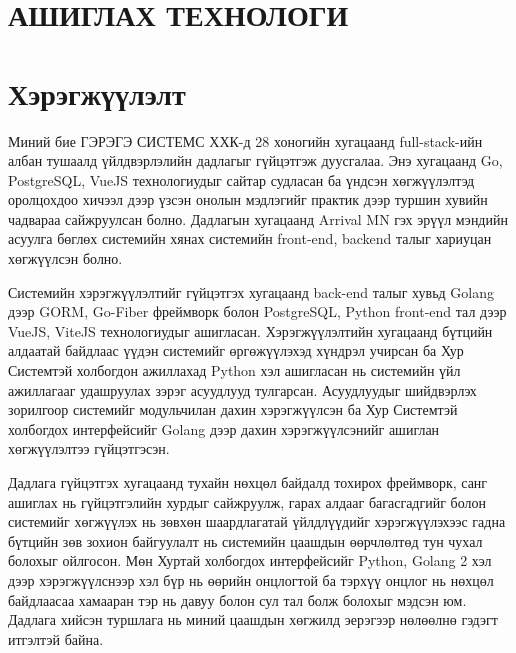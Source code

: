 \documentclass[12pt,A4]{report}
\begin{document}
\chapter{АШИГЛАХ ТЕХНОЛОГИ}


\chapter{Хэрэгжүүлэлт} 



Миний бие ГЭРЭГЭ СИСТЕМС ХХК-д 28 хоногийн хугацаанд full-stack-ийн албан тушаалд үйлдвэрлэлийн дадлагыг гүйцэтгэж дуусгалаа. Энэ хугацаанд Go, PostgreSQL, VueJS технологиудыг сайтар судласан ба үндсэн хөгжүүлэлтэд оролцохдоо хичээл дээр үзсэн онолын мэдлэгийг практик дээр туршин хувийн чадвараа сайжруулсан болно. Дадлагын хугацаанд Arrival MN гэх эрүүл мэндийн асуулга бөглөх системийн хянах системийн front-end, backend талыг хариуцан хөгжүүлсэн болно. 

\setlength\parindent{24pt} Системийн хэрэгжүүлэлтийг гүйцэтгэх хугацаанд back-end талыг хувьд Golang дээр GORM, Go-Fiber фреймворк болон PostgreSQL, Python front-end тал дээр VueJS, ViteJS технологиудыг ашигласан. Хэрэгжүүлэлтийн хугацаанд бүтцийн алдаатай байдлаас үүдэн системийг өргөжүүлэхэд хүндрэл учирсан ба Хур Системтэй холбогдон ажиллахад Python хэл ашигласан нь системийн үйл ажиллагааг удашруулах зэрэг асуудлууд тулгарсан. Асуудлуудыг шийдвэрлэх зорилгоор системийг модульчилан дахин хэрэгжүүлсэн ба Хур Системтэй холбогдох интерфейсийг Golang дээр дахин хэрэгжүүлсэнийг ашиглан хөгжүүлэлтээ гүйцэтгэсэн. 

\setlength\parindent{24pt} Дадлага гүйцэтгэх хугацаанд тухайн нөхцөл байдалд тохирох фреймворк, санг ашиглах нь гүйцэтгэлийн хурдыг сайжруулж, гарах алдааг багасгадгийг болон системийг хөгжүүлэх нь зөвхөн шаардлагатай үйлдлүүдийг хэрэгжүүлэхээс гадна бүтцийн зөв зохион байгуулалт нь системийн цаашдын өөрчлөлтөд тун чухал болохыг ойлгосон. Мөн Хуртай холбогдох интерфейсийг Python, Golang 2 хэл дээр хэрэгжүүлснээр  хэл бүр нь өөрийн онцлогтой ба тэрхүү онцлог нь нөхцөл байдлаасаа хамааран тэр нь давуу болон сул тал болж болохыг мэдсэн юм. Дадлага хийсэн туршлага нь миний цаашдын хөгжилд эерэгээр нөлөөлнө гэдэгт итгэлтэй байна.
\end{document}
